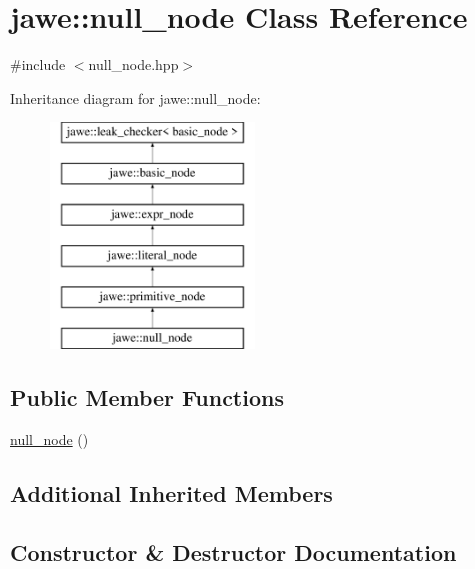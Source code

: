 \hypertarget{classjawe_1_1null__node}{}\section{jawe\+:\+:null\+\_\+node Class Reference}
\label{classjawe_1_1null__node}


{\ttfamily \#include $<$null\+\_\+node.\+hpp$>$}

Inheritance diagram for jawe\+:\+:null\+\_\+node\+:\begin{figure}[H]
\begin{center}
\leavevmode
\includegraphics[height=6.000000cm]{classjawe_1_1null__node}
\end{center}
\end{figure}
\subsection*{Public Member Functions}
\begin{DoxyCompactItemize}
\item 
\hyperlink{classjawe_1_1null__node_a7a4e26a2e0f458b65a98f6b5aedd58fa}{null\+\_\+node} ()
\end{DoxyCompactItemize}
\subsection*{Additional Inherited Members}


\subsection{Constructor \& Destructor Documentation}
\mbox{\label{classjawe_1_1null__node_a7a4e26a2e0f458b65a98f6b5aedd58fa}} 
